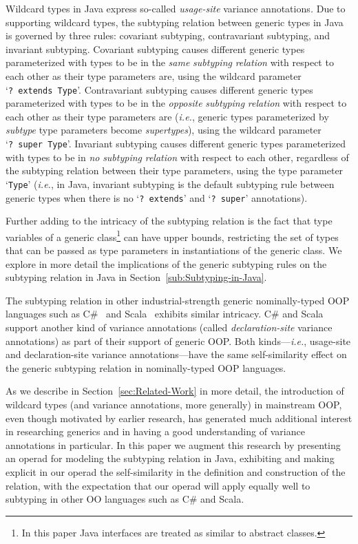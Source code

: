 \documentclass[twocolumn,english]{article}
\numberwithin{equation}{section}
\numberwithin{figure}{section}
\newcommand{\code}[1]{\texttt{#1}}
\begin{document}
Wildcard types in Java express so-called \emph{usage-site} variance
annotations\emph{. }Due to supporting wildcard types, the subtyping
relation between generic types in Java is governed by three rules:
covariant subtyping, contravariant subtyping, and invariant subtyping.
Covariant subtyping causes different generic types parameterized with
types to be in the \emph{same} \emph{subtyping} \emph{relation} with
respect to each other as their type parameters are, using the wildcard
parameter `\code{?~extends~Type}'. Contravariant subtyping causes
different generic types parameterized with types to be in the \emph{opposite}
\emph{subtyping} \emph{relation} with respect to each other as their
type parameters are (\emph{i.e.}, generic types parameterized by \emph{subtype}
type parameters become \emph{supertypes}), using the wildcard parameter
`\code{?~super~Type}'. Invariant subtyping causes different generic
types parameterized with types to be in \emph{no} \emph{subtyping}
\emph{relation} with respect to each other, regardless of the subtyping
relation between their type parameters, using the type parameter `\code{Type}'
(\emph{i.e.}, in Java, invariant subtyping is the default subtyping
rule between generic types when there is no `\code{?~extends}'
and `\code{?~super}' annotations).

Further adding to the intricacy of the subtyping relation is the fact
that type variables of a generic class\footnote{In this paper Java interfaces are treated as similar to abstract classes.}
can have upper bounds, restricting the set of types that can be passed
as type parameters in instantiations of the generic class. We explore
in more detail the implications of the generic subtyping rules on
the subtyping relation in Java in Section~\ref{sub:Subtyping-in-Java}.

The subtyping relation in other industrial-strength generic nominally-typed
OOP languages such as C\#~\cite{CSharp2015} and Scala~\cite{Odersky14}
exhibits similar intricacy. C\# and Scala support another kind of
variance annotations (called \emph{declaration-site} variance annotations)
as part of their support of generic OOP. Both kinds---\emph{i.e.},
usage-site and declaration-site variance annotations---have the same
self-similarity effect on the generic subtyping relation in nominally-typed
OOP languages.

As we describe in Section~\ref{sec:Related-Work} in more detail,
the introduction of wildcard types (and variance annotations, more
generally) in mainstream OOP, even though motivated by earlier research,
has generated much additional interest in researching generics and
in having a good understanding of variance annotations in particular.
In this paper we augment this research by presenting an operad for
modeling the subtyping relation in Java, exhibiting and making explicit
in our operad the self-similarity in the definition and construction
of the relation, with the expectation that our operad will apply equally
well to subtyping in other OO languages such as C\# and Scala.
\end{document}
